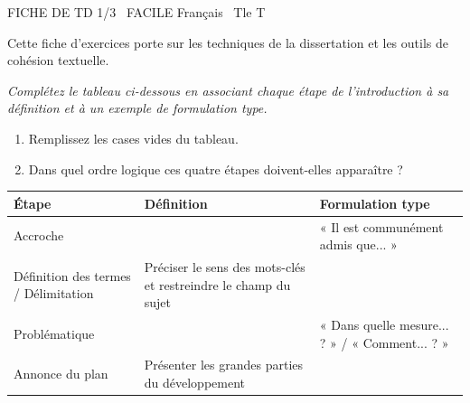 \documentclass[11pt]{article}
\begin{document}
\begin{tcolorbox}[enhanced,colback=popink,colframe=popink,arc=10pt,boxrule=0pt,left=12pt,right=12pt,top=9pt,bottom=9pt]
{\color{white}\popxbold\small FICHE DE TD 1/3 \textbullet\ FACILE \hfill Français \textbullet\ Tle T\par}
\end{tcolorbox}
\vspace{4pt}
Cette fiche d'exercices porte sur les techniques de la dissertation et les outils de cohésion textuelle.

\begin{exercice}
\label{exo:intro}
\emph{Complétez le tableau ci-dessous en associant chaque étape de l'introduction à sa définition et à un exemple de formulation type.}
\begin{enumerate}
    \item Remplissez les cases vides du tableau.
    \item Dans quel ordre logique ces quatre étapes doivent-elles apparaître ?
\end{enumerate}
\begin{tabularx}{\linewidth}{|X|X|X|}
\hline
\textbf{Étape} & \textbf{Définition} & \textbf{Formulation type} \\
\hline
Accroche &  & « Il est communément admis que... » \\
\hline
Définition des termes / Délimitation & Préciser le sens des mots-clés et restreindre le champ du sujet &  \\
\hline
Problématique &  & « Dans quelle mesure... ? » / « Comment... ? » \\
\hline
Annonce du plan & Présenter les grandes parties du développement &  \\
\hline
\end{tabularx}
\end{exercice}
\end{document}
